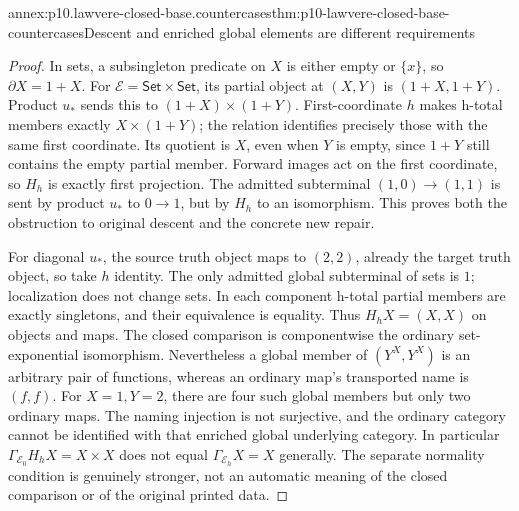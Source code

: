 \begin{annexitem}{annex:p10.lawvere-closed-base.countercases}{thm:p10-lawvere-closed-base-countercases}{Descent and enriched global elements are different requirements}
\begin{proof}
In sets, a subsingleton predicate on \(X\) is either empty or
\(\{x\}\), so \(\partial X=1+X\). For
\(\mathcal E=\mathsf{Set}\times\mathsf{Set}\), its partial
object at \((X,Y)\) is \((1+X,1+Y)\). Product \(u_*\)
sends this to \((1+X)\times(1+Y)\). First-coordinate \(h\)
makes h-total members exactly \(X\times(1+Y)\); the relation
identifies precisely those with the same first coordinate. Its quotient
is \(X\), even when \(Y\) is empty, since \(1+Y\) still
contains the empty partial member. Forward images act on the first
coordinate, so \(H_h\) is exactly first projection. The admitted
subterminal \((1,0)\to(1,1)\) is sent by product \(u_*\)
to \(0\to1\), but by \(H_h\) to an isomorphism. This proves
both the obstruction to original descent and the concrete new repair.

For diagonal \(u_*\), the source truth object maps to \((2,2)\),
already the target truth object, so take \(h\) identity. The only
admitted global subterminal of sets is \(1\); localization does
not change sets. In each component h-total partial members are exactly
singletons, and their equivalence is equality. Thus \(H_hX=(X,X)\)
on objects and maps. The closed comparison is componentwise the ordinary
set-exponential isomorphism. Nevertheless a global member of
\((Y^X,Y^X)\) is an arbitrary pair of functions, whereas an ordinary
map's transported name is \((f,f)\). For \(X=1,Y=2\), there
are four such global members but only two ordinary maps. The naming
injection is not surjective, and the ordinary category cannot be
identified with that enriched global underlying category. In particular
\(\Gamma_{\mathcal E_0}H_hX=X\times X\) does not equal
\(\Gamma_{\mathcal E_h}X=X\) generally. The separate normality
condition is genuinely stronger, not an automatic meaning of the closed
comparison or of the original printed data.
\end{proof}
\end{annexitem}

